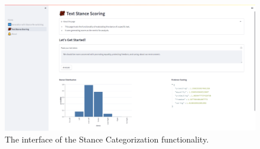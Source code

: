 \begin{figure}[ht]
    \centering
    \includegraphics[width=\textwidth]{img/demo-detection}
    \caption{The interface of the Stance Categorization functionality.}
    \label{fig:demo-detection}
\end{figure}
